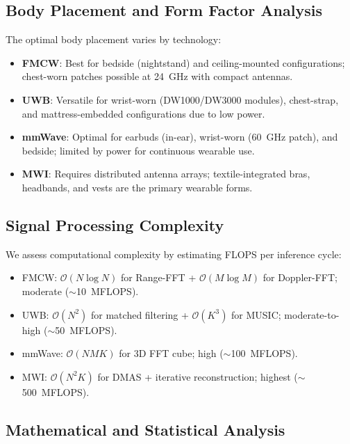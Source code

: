 \documentclass[journal,twoside]{IEEEtran}
\begin{document}
\subsection{Body Placement and Form Factor Analysis}
The optimal body placement varies by technology:
\begin{itemize}
\item \textbf{FMCW}: Best for bedside (nightstand) and ceiling-mounted configurations; chest-worn patches possible at 24~GHz with compact antennas.
\item \textbf{UWB}: Versatile for wrist-worn (DW1000/DW3000 modules), chest-strap, and mattress-embedded configurations due to low power.
\item \textbf{mmWave}: Optimal for earbuds (in-ear), wrist-worn (60~GHz patch), and bedside; limited by power for continuous wearable use.
\item \textbf{MWI}: Requires distributed antenna arrays; textile-integrated bras, headbands, and vests are the primary wearable forms.
\end{itemize}

\subsection{Signal Processing Complexity}
We assess computational complexity by estimating FLOPS per inference cycle:
\begin{itemize}
\item FMCW: $\mathcal{O}(N \log N)$ for Range-FFT + $\mathcal{O}(M \log M)$ for Doppler-FFT; moderate ($\sim$10~MFLOPS).
\item UWB: $\mathcal{O}(N^2)$ for matched filtering + $\mathcal{O}(K^3)$ for MUSIC; moderate-to-high ($\sim$50~MFLOPS).
\item mmWave: $\mathcal{O}(N M K)$ for 3D FFT cube; high ($\sim$100~MFLOPS).
\item MWI: $\mathcal{O}(N^2 K)$ for DMAS + iterative reconstruction; highest ($\sim$500~MFLOPS).
\end{itemize}

\subsection{Mathematical and Statistical Analysis}
\end{document}
